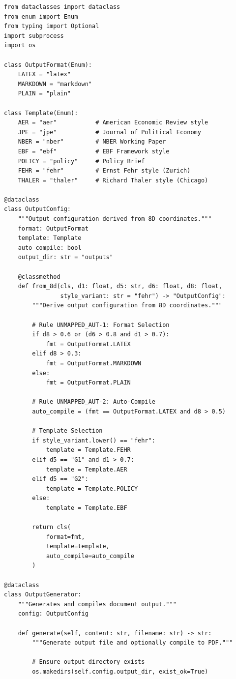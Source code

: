 \begin{verbatim}
from dataclasses import dataclass
from enum import Enum
from typing import Optional
import subprocess
import os

class OutputFormat(Enum):
    LATEX = "latex"
    MARKDOWN = "markdown"
    PLAIN = "plain"

class Template(Enum):
    AER = "aer"           # American Economic Review style
    JPE = "jpe"           # Journal of Political Economy
    NBER = "nber"         # NBER Working Paper
    EBF = "ebf"           # EBF Framework style
    POLICY = "policy"     # Policy Brief
    FEHR = "fehr"         # Ernst Fehr style (Zurich)
    THALER = "thaler"     # Richard Thaler style (Chicago)

@dataclass
class OutputConfig:
    """Output configuration derived from 8D coordinates."""
    format: OutputFormat
    template: Template
    auto_compile: bool
    output_dir: str = "outputs"

    @classmethod
    def from_8d(cls, d1: float, d5: str, d6: float, d8: float,
                style_variant: str = "fehr") -> "OutputConfig":
        """Derive output configuration from 8D coordinates."""

        # Rule UNMAPPED_AUT-1: Format Selection
        if d8 > 0.6 or (d6 > 0.8 and d1 > 0.7):
            fmt = OutputFormat.LATEX
        elif d8 > 0.3:
            fmt = OutputFormat.MARKDOWN
        else:
            fmt = OutputFormat.PLAIN

        # Rule UNMAPPED_AUT-2: Auto-Compile
        auto_compile = (fmt == OutputFormat.LATEX and d8 > 0.5)

        # Template Selection
        if style_variant.lower() == "fehr":
            template = Template.FEHR
        elif d5 == "G1" and d1 > 0.7:
            template = Template.AER
        elif d5 == "G2":
            template = Template.POLICY
        else:
            template = Template.EBF

        return cls(
            format=fmt,
            template=template,
            auto_compile=auto_compile
        )

@dataclass
class OutputGenerator:
    """Generates and compiles document output."""
    config: OutputConfig

    def generate(self, content: str, filename: str) -> str:
        """Generate output file and optionally compile to PDF."""

        # Ensure output directory exists
        os.makedirs(self.config.output_dir, exist_ok=True)


\end{verbatim}
